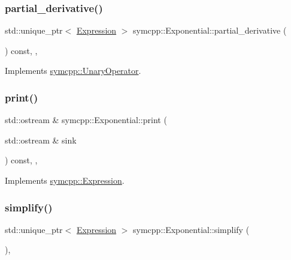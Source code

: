 \subsubsection{\texorpdfstring{partial\_derivative()}{partial\_derivative()}}
{\footnotesize\ttfamily std\+::unique\+\_\+ptr$<$ \mbox{\hyperlink{classsymcpp_1_1Expression}{Expression}} $>$ symcpp\+::\+Exponential\+::partial\+\_\+derivative (\begin{DoxyParamCaption}{ }\end{DoxyParamCaption}) const\hspace{0.3cm}{\ttfamily [override]}, {\ttfamily [private]}, {\ttfamily [virtual]}}



Implements \mbox{\hyperlink{classsymcpp_1_1UnaryOperator_a85de3214870cd72edc63ac1c221ddeee}{symcpp\+::\+Unary\+Operator}}.

\mbox{\label{classsymcpp_1_1Exponential_a2af4d6f507139799516d960293f74343}} 
\subsubsection{\texorpdfstring{print()}{print()}}
{\footnotesize\ttfamily std\+::ostream \& symcpp\+::\+Exponential\+::print (\begin{DoxyParamCaption}\item[{std\+::ostream \&}]{sink }\end{DoxyParamCaption}) const\hspace{0.3cm}{\ttfamily [override]}, {\ttfamily [private]}, {\ttfamily [virtual]}}



Implements \mbox{\hyperlink{classsymcpp_1_1Expression_af37e13032a40f2da4d2866eaa8658049}{symcpp\+::\+Expression}}.

\mbox{\label{classsymcpp_1_1Exponential_a099298ffa8721a8bb646d98518542d24}} 
\subsubsection{\texorpdfstring{simplify()}{simplify()}}
{\footnotesize\ttfamily std\+::unique\+\_\+ptr$<$ \mbox{\hyperlink{classsymcpp_1_1Expression}{Expression}} $>$ symcpp\+::\+Exponential\+::simplify (\begin{DoxyParamCaption}{ }\end{DoxyParamCaption})\hspace{0.3cm}{\ttfamily [override]}, {\ttfamily [virtual]}}



